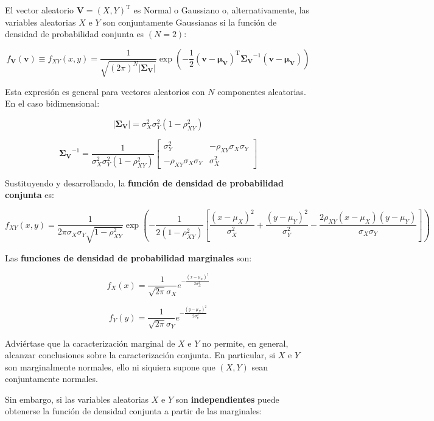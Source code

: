 \documentclass[11pt]{article}
\begin{document}
El vector aleatorio \(\mathbf{V}=(X,Y)^\mathrm{T}\) es Normal o
Gaussiano o, alternativamente, las variables aleatorias \(X\) e \(Y\)
son conjuntamente Gaussianas si la función de densidad de probabilidad
conjunta es \((N=2)\):

\[
f_{\mathbf{V}}\left(\mathbf{v}\right)\equiv f_{XY}\left(x,y\right)=\frac{1}{\sqrt{(2 \pi)^N\boldsymbol{|\Sigma_V}|}}\exp \left(-\frac{1}{2}(\mathbf{v}-\boldsymbol{\mu_V})^{\mathrm{T}} \boldsymbol{\Sigma_V}^{-1}(\mathbf{v}-\boldsymbol{\mu_V})\right)
\]

Esta expresión es general para vectores aleatorios con \(N\) componentes
aleatorias. En el caso bidimensional:

\[
|\boldsymbol{\Sigma_V}|=\sigma_{X}^{2} \sigma_{Y}^{2}\left(1-\rho_{XY}^{2}\right)
\]

\[
\boldsymbol{\Sigma_V}^{-1}=\frac{1}{\sigma_{X}^{2} \sigma_{Y}^{2}\left(1-\rho_{XY}^{2}\right)} \left[ \begin{array}{cc}{\sigma_{Y}^{2}} & {-\rho_{XY} \sigma_{X} \sigma_{Y}} \\ {-\rho_{XY} \sigma_{X} \sigma_{Y}} & {\sigma_{X}^{2}}\end{array}\right]
\]

    Sustituyendo y desarrollando, la \textbf{función de densidad de
probabilidad conjunta} es:

\[
f_{XY}(x, y)=\frac{1}{2 \pi \sigma_{X} \sigma_{Y} \sqrt{1-\rho_{XY}^{2}}} \exp \left(-\frac{1}{2\left(1-\rho_{XY}^{2}\right)}\left[\frac{\left(x-\mu_{X}\right)^{2}}{\sigma_{X}^{2}}+\frac{\left(y-\mu_{Y}\right)^{2}}{\sigma_{Y}^{2}}-\frac{2 \rho_{XY}\left(x-\mu_{X}\right)\left(y-\mu_{Y}\right)}{\sigma_{X} \sigma_{Y}}\right]\right)
\]

Las \textbf{funciones de densidad de probabilidad marginales} son:

\[
f_{X}(x)=\frac{1}{\sqrt{2 \pi} \sigma_{X} } e^{-\frac{\left(x-\mu_{X}\right)^{2}} {2\sigma_{X}^{2}}} 
\]

\[
f_{Y}(y)=\frac{1}{\sqrt{2 \pi} \sigma_{Y} } e^{-\frac{\left(y-\mu_{X}\right)^{2}} {2\sigma_{Y}^{2}}} 
\]

    Adviértase que la caracterización marginal de \(X\) e \(Y\) no permite,
en general, alcanzar conclusiones sobre la caracterización conjunta. En
particular, si \(X\) e \(Y\) son marginalmente normales, ello ni
siquiera supone que \((X,Y)\) sean conjuntamente normales.

Sin embargo, si las variables aleatorias \(X\) e \(Y\) son
\textbf{independientes} puede obtenerse la función de densidad conjunta
a partir de las marginales:
\end{document}
